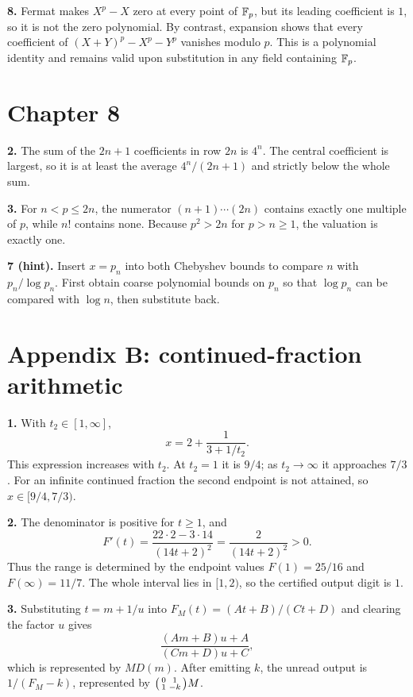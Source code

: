 \textbf{8.} Fermat makes $X^p-X$ zero at every point of $\mathbb F_p$,
but its leading coefficient is $1$, so it is not the zero polynomial.
By contrast, expansion shows that every coefficient of
$(X+Y)^p-X^p-Y^p$ vanishes modulo $p$. This is a polynomial identity
and remains valid upon substitution in any field containing $\mathbb F_p$.

\section*{Chapter 8}

\textbf{2.} The sum of the $2n+1$ coefficients in row $2n$ is $4^n$. The central coefficient is largest, so it is at least the average $4^n/(2n+1)$ and strictly below the whole sum.

\textbf{3.} For $n<p\le2n$, the numerator $(n+1)\cdots(2n)$ contains exactly one multiple of $p$, while $n!$ contains none. Because $p^2>2n$ for $p>n\ge1$, the valuation is exactly one.

\textbf{7 (hint).} Insert $x=p_n$ into both Chebyshev bounds to compare $n$ with $p_n/\log p_n$. First obtain coarse polynomial bounds on $p_n$ so that $\log p_n$ can be compared with $\log n$, then substitute back.

\section*{Appendix B: continued-fraction arithmetic}

\textbf{1.} With $t_2\in[1,\infty]$,
\[
 x=2+\frac1{3+1/t_2}.
\]
This expression increases with $t_2$.  At $t_2=1$ it is $9/4$; as
$t_2\to\infty$ it approaches $7/3$.  For an infinite continued fraction the
second endpoint is not attained, so $x\in[9/4,7/3)$.

\textbf{2.} The denominator is positive for $t\geq1$, and
\[
 F'(t)=\frac{22\cdot2-3\cdot14}{(14t+2)^2}
       =\frac2{(14t+2)^2}>0.
\]
Thus the range is determined by the endpoint values
$F(1)=25/16$ and $F(\infty)=11/7$.  The whole interval lies in $[1,2)$, so
the certified output digit is $1$.

\textbf{3.} Substituting $t=m+1/u$ into
$F_M(t)=(At+B)/(Ct+D)$ and clearing the factor $u$ gives
\[
 \frac{(Am+B)u+A}{(Cm+D)u+C},
\]
which is represented by $MD(m)$.  After emitting $k$, the unread output is
$1/(F_M-k)$, represented by
$\begin{psmallmatrix}0&1\\1&-k\end{psmallmatrix}M$.

